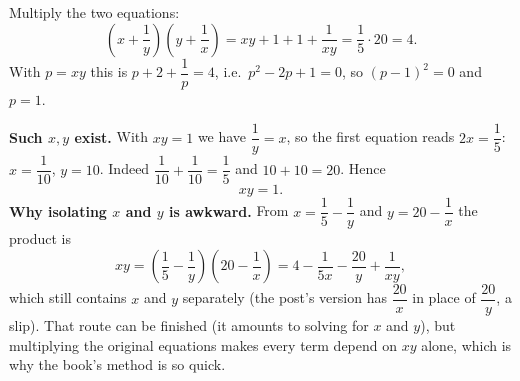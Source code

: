 Multiply the two equations:
\[
\left(x+\dfrac{1}{y}\right)\left(y+\dfrac{1}{x}\right)=xy+1+1+\dfrac{1}{xy}=\dfrac{1}{5}\cdot20=4 .
\]
With $p=xy$ this is $p+2+\dfrac{1}{p}=4$, i.e.\ $p^2-2p+1=0$, so $(p-1)^2=0$ and $p=1$.

\textbf{Such $x,y$ exist.} With $xy=1$ we have $\dfrac{1}{y}=x$, so the first equation reads $2x=\dfrac{1}{5}$: $x=\dfrac{1}{10}$, $y=10$. Indeed $\dfrac{1}{10}+\dfrac{1}{10}=\dfrac{1}{5}$ and $10+10=20$. Hence
\[
xy=\boxed{1}.
\]
\textbf{Why isolating $x$ and $y$ is awkward.} From $x=\dfrac{1}{5}-\dfrac{1}{y}$ and $y=20-\dfrac{1}{x}$ the product is
\[
xy=\left(\dfrac{1}{5}-\dfrac{1}{y}\right)\left(20-\dfrac{1}{x}\right)=4-\dfrac{1}{5x}-\dfrac{20}{y}+\dfrac{1}{xy},
\]
which still contains $x$ and $y$ separately (the post's version has $\dfrac{20}{x}$ in place of $\dfrac{20}{y}$, a slip). That route can be finished (it amounts to solving for $x$ and $y$), but multiplying the original equations makes every term depend on $xy$ alone, which is why the book's method is so quick.
